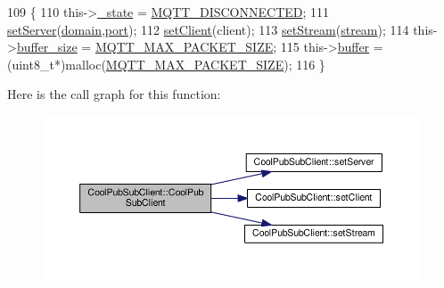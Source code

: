 \begin{DoxyCode}
109                                                                                                     \{
110     this->\hyperlink{class_cool_pub_sub_client_aa1953b601206252a30efa5b114eb3e1a}{\_state} = \hyperlink{_cool_pub_sub_client_8h_adaf86a906a305dd129164982d50111b3}{MQTT\_DISCONNECTED};
111     \hyperlink{class_cool_pub_sub_client_a947e70c394c66c7d08d0c53caf8425e3}{setServer}(\hyperlink{class_cool_pub_sub_client_a08d3a5619724f3408ad406ca4fb776e1}{domain},\hyperlink{class_cool_pub_sub_client_a01e3249102c057756af7a515c179844e}{port});
112     \hyperlink{class_cool_pub_sub_client_a7ee119b786010561ab6a9afa0798e91d}{setClient}(client);
113     \hyperlink{class_cool_pub_sub_client_ae97e40823ea689ff9e36d5bdd71bb933}{setStream}(\hyperlink{class_cool_pub_sub_client_a7a92417b317e7bd9502ed37752111705}{stream});
114     this->\hyperlink{class_cool_pub_sub_client_ae6cb10e42c057483d53516ac830ab526}{buffer\_size} = \hyperlink{_cool_pub_sub_client_8h_ae09b594688a59f1427c7e45259e039b9}{MQTT\_MAX\_PACKET\_SIZE};
115     this->\hyperlink{class_cool_pub_sub_client_a7e8bcc6096626916046a51bebadc7851}{buffer} = (uint8\_t*)malloc(\hyperlink{_cool_pub_sub_client_8h_ae09b594688a59f1427c7e45259e039b9}{MQTT\_MAX\_PACKET\_SIZE});
116 \}
\end{DoxyCode}
Here is the call graph for this function\+:\nopagebreak
\begin{figure}[H]
\begin{center}
\leavevmode
\includegraphics[width=350pt]{d8/d4b/class_cool_pub_sub_client_a103e7286407babde84d63bb735c4e4b6_cgraph}
\end{center}
\end{figure}
\mbox{\label{class_cool_pub_sub_client_a2aea0a9487dc15b9db1caf0f069eb877}} 
